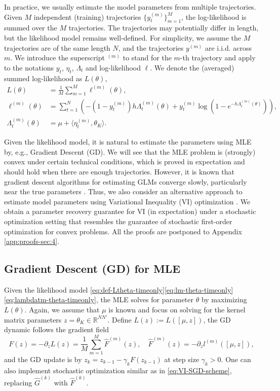 \documentclass[11pt]{article}
\theoremstyle{remark}
\theoremstyle{plain}
\newcommand{\R}{\mathbb{R}}
\begin{document}
In practice, we usually estimate the model parameters from multiple trajectories. Given $M$  independent (training) trajectories  $\{ y_t^{(m)}\}_{m=1}^M $, the log-likelihood is summed over the $M$ trajectories.
The trajectories may potentially differ in length, but the likelihood model remains well-defined. For simplicity, we assume the $M$ trajectories are of the same length $N$, and the trajectories $y^{(m)}$ are i.i.d. across $m$. 
We introduce the superscript $^{(m)}$ to stand for the $m$-th trajectory and apply to the notations $y_t$, $\eta_t$, $\Lambda_t$ and log-likelihood $\ell$. 
We denote the (averaged) summed log-likelihood as $L(\theta)$, 
\begin{align}
L(\theta) 
& = \frac{1}{M}\sum_{m=1}^M \ell^{(m)}(\theta),  \label{eq:def-Ltheta-timeonly} \\
\ell^{(m)} (\theta)
& = \sum_{t=1}^N \left( 
- (1-y_t^{(m)} ) h \Lambda_t^{(m)}(\theta) +  y_t^{(m)}  \log ( 1 - e^{ - h \Lambda_t^{(m)}(\theta)} )
\right),  \label{eq:lm-theta-timeonly}\\
 \Lambda_t^{(m)}(\theta) 
& = \mu + \langle \eta_t^{(m)} , \theta_K \rangle. \label{eq:lambdatm-theta-timeonly}
\end{align}

Given the likelihood model, it is natural to estimate the parameters using MLE by, e.g., Gradient Descent (GD).
We will see that the MLE problem is (strongly) convex under certain technical conditions, which is proved in expectation and should hold when there are enough trajectories. However, it is known that gradient descent algorithms for estimating GLMs converge slowly, particularly near the true parameters \cite{he2020point}. Thus, we also consider an alternative approach to estimate model parameters using Variational Inequality (VI) optimization \cite{juditsky2019signal}. We obtain a parameter recovery guarantee for VI (in expectation) under a stochastic optimization setting that resembles the guarantee of stochastic first-order optimization for convex problems.
All the proofs are postponed to Appendix \ref{app:proofs-sec:4}.


\subsection{Gradient Descent (GD) for MLE}\label{subsec:GD-shceme-timeonly}

Given the likelihood model \eqref{eq:def-Ltheta-timeonly}\eqref{eq:lm-theta-timeonly}\eqref{eq:lambdatm-theta-timeonly}, the MLE solves for parameter $\theta$ by maximizing $L(\theta)$.
Again, we assume that $\mu$ is known and focus on solving for the kernel matrix parameters $ z= \theta_K \in \R^{ N N'}$. Define $L(z) := L([\mu, z])$, the GD dynamic follows the gradient field
\[
F(z) = - \partial_z L(z) =  \frac{1}{M} \sum_{m=1}^M \hat F^{(m)}(z),
\quad 
\hat F^{(m)}(z) = - \partial_z l^{(m)}([\mu, z]),
\]
and the GD update is by $z_{k} = z_{k-1} - \gamma_k F(z_{k-1})$ at step size $\gamma_k > 0$.
One can also implement stochastic optimization similar as in \eqref{eq:VI-SGD-scheme},  replacing $\hat G^{(k)}$ with $\hat F^{(k)}$. 
\end{document}
